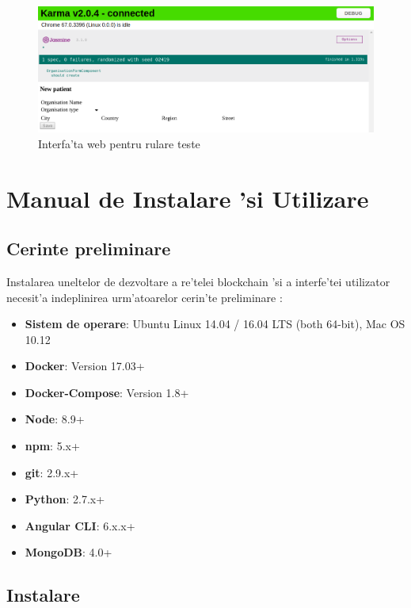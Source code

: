 \documentclass[12pt,a4paper,twoside]{report}
\begin{document}
                 \begin{figure}[H]
		\begin{center}
			\includegraphics[scale=0.35]{img/karma.png}
			\caption{Interfa'ta web pentru rulare teste}
  			\label{fig:karma}
  		\end{center}
  		\end{figure}
  		
    
    
      	
\chapter{Manual de Instalare 'si Utilizare}
\section{Cerinte preliminare}
Instalarea uneltelor de dezvoltare a re'telei blockchain 'si a interfe'tei utilizator necesit'a indeplinirea urm'atoarelor cerin'te preliminare :
\begin{itemize}
    \item \textbf{Sistem de operare}: Ubuntu Linux 14.04 / 16.04 LTS (both 64-bit), Mac OS 10.12
    \item \textbf{Docker}: Version 17.03+
    \item \textbf{Docker-Compose}: Version 1.8+
    \item \textbf{Node}: 8.9+
    \item \textbf{npm}: 5.x+
    \item \textbf{git}: 2.9.x+ 
    \item \textbf{Python}: 2.7.x+
    \item \textbf{Angular CLI}: 6.x.x+
    \item \textbf{MongoDB}: 4.0+
\end{itemize}

\section{Instalare}
\end{document}
